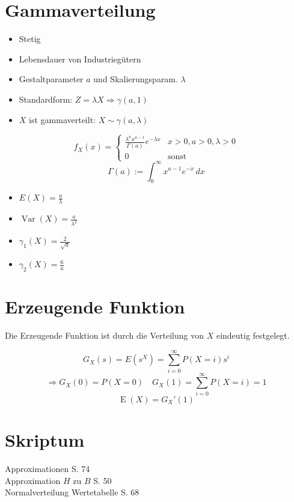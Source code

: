 \documentclass[a4paper,twocolumn]{article}
\DeclareMathOperator{\Var}{Var}
\DeclareMathOperator{\E}{E}
\begin{document}
\section{Gammaverteilung}

\begin{itemize}
  \item Stetig
  \item Lebensdauer von Industriegütern
  \item Gestaltparameter $a$ und Skalierungsparam. $\lambda$
  \item Standardform: $Z = \lambda X \Rightarrow \gamma(a,1)$
  \item $X$ ist gammaverteilt: $X \sim \gamma(a,\lambda)$
\end{itemize}

\[
    f_X(x) = \left\{\begin{array}{ll}
        \frac{\lambda^a x^{a-1}}{\Gamma(a)} e^{-\lambda x}
                    & x > 0, a > 0, \lambda > 0 \\
        0           & \text{sonst}
    \end{array}\right.
\] \[
    \Gamma(a) := \int_0^\infty x^{a-1} e^{-x}\,dx
\]

\begin{itemize}
  \item $E(X) = \frac{a}\lambda$
  \item $\Var(X) = \frac{a}{\lambda^2}$
  \item $\gamma_1(X) = \frac2{\sqrt{a}}$
  \item $\gamma_2(X) = \frac6{a}$
\end{itemize}

\newpage
\section{Erzeugende Funktion}

Die Erzeugende Funktion ist durch die Verteilung von $X$
eindeutig festgelegt.

\[
    G_X(s) = E(s^X) = \sum_{i=0}^\infty P(X = i) s^i
\] \[
    \Rightarrow G_X(0) = P(X=0) \quad G_X(1)
        = \sum_{i=0}^\infty P(X=i) = 1
\] \[
    \E(X) = G_X'(1)
\]

\section{Skriptum}

Approximationen S. 74 \\
Approximation $H$ zu $B$ S. 50 \\
Normalverteilung Wertetabelle S. 68
\end{document}
